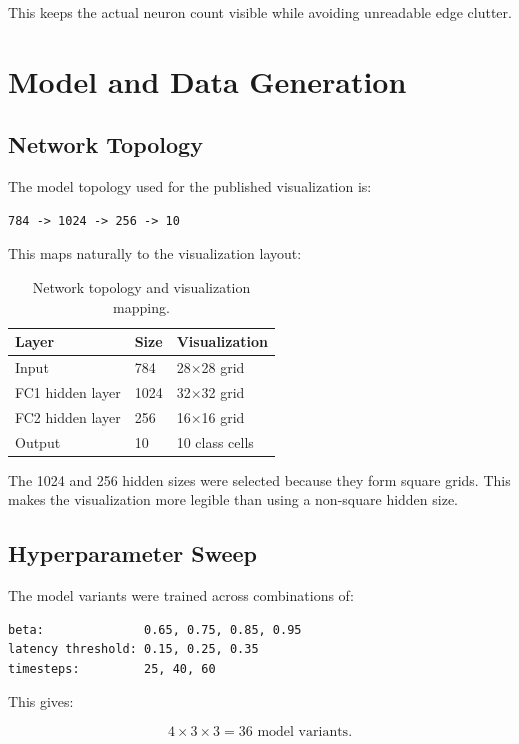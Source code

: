 \documentclass[11pt,a4paper]{article}
\begin{document}
This keeps the actual neuron count visible while avoiding unreadable edge clutter.

\section{Model and Data Generation}

\subsection{Network Topology}

The model topology used for the published visualization is:

\begin{lstlisting}
784 -> 1024 -> 256 -> 10
\end{lstlisting}

This maps naturally to the visualization layout:

\begin{table}[H]
\centering
\caption{Network topology and visualization mapping.}
\begin{tabular}{lll}
\toprule
Layer & Size & Visualization \\
\midrule
Input & 784 & 28$\times$28 grid \\
FC1 hidden layer & 1024 & 32$\times$32 grid \\
FC2 hidden layer & 256 & 16$\times$16 grid \\
Output & 10 & 10 class cells \\
\bottomrule
\end{tabular}
\end{table}

The 1024 and 256 hidden sizes were selected because they form square grids. This makes the visualization more legible than using a non-square hidden size.

\subsection{Hyperparameter Sweep}

The model variants were trained across combinations of:

\begin{lstlisting}
beta:              0.65, 0.75, 0.85, 0.95
latency threshold: 0.15, 0.25, 0.35
timesteps:         25, 40, 60
\end{lstlisting}

This gives:

\begin{equation}
4 \times 3 \times 3 = 36 \text{ model variants.}
\end{equation}
\end{document}
